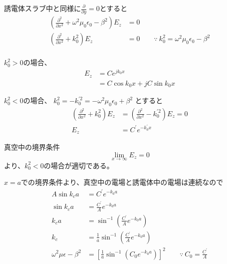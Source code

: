 \documentclass[a4paper,10pt]{bxjsarticle}
\begin{document}
誘電体スラブ中と同様に$\frac{\partial}{\partial y} = 0$とすると
\begin{align*}
    \left( 
        \frac{\partial^2}{\partial x^2} 
        + \omega^2 \mu_0 \epsilon_0 - \beta^2 
    \right) E_z
    & = 0 \\
    \left( 
        \frac{\partial^2}{\partial x^2} 
        + k_0^2
    \right) E_z
    & = 0 \qquad
    \because \ k_0^2 = \omega^2 \mu_0 \epsilon_0 - \beta^2 \\
\end{align*}

$k_0^2 > 0$の場合、
\begin{align*}
    E_z &= C e^{j k_0 x} \\
        &= C \cos k_0 x + j C \sin k_0 x
\end{align*}

$k_0^2 < 0$の場合、
$k_0^2 = - k_0^{\prime 2} = - \omega^2 \mu_0 \epsilon_0 + \beta^2$ とすると
\begin{align*}
    \left( 
        \frac{\partial^2}{\partial x^2} 
        + k_0^2
    \right) E_z
    & =
    \left( 
        \frac{\partial^2}{\partial x^2} 
        - k_0^{\prime 2}
    \right) E_z
    = 0 \\
    E_z &= C^\prime e^{- k_0^\prime x}
\end{align*}

真空中の境界条件 
$$\lim_{x \to \infty} E_z = 0$$
より、$k_0^2 < 0$の場合が適切である。

$x=a$での境界条件より、真空中の電場と誘電体中の電場は連続なので
\begin{align*}
    A \sin k_c a & = C^\prime e^{- k_0 a} \\
    \sin k_c a & = \frac{C^\prime}{A} e^{- k_0 a} \\
    k_c a & = \sin^{-1} \left( \frac{C^\prime}{A} e^{- k_0 a} \right) \\
    k_c & = \frac{1}{a} \sin^{-1} \left( \frac{C^\prime}{A} e^{- k_0 a} \right) \\
    \omega^2 \mu \epsilon - \beta^2 &= 
        \left[ 
            \frac{1}{a} \sin^{-1} \left( C_0 e^{- k_0 a} \right)
        \right]^2 \qquad
    \because \ C_0 = \frac{C^\prime}{A}
\end{align*}

\end{document}

